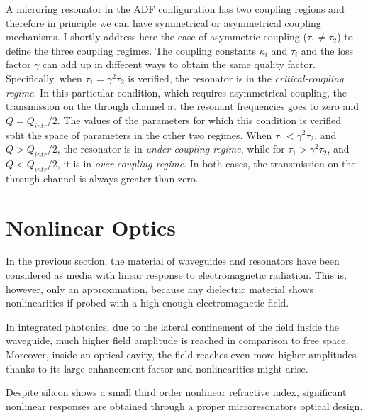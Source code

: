A microring resonator in the ADF configuration has two coupling regions and therefore in principle we can have symmetrical or asymmetrical coupling mechanisms.
I shortly address here the case of asymmetric coupling ($\tau_1 \neq \tau_2$) to define the three coupling regimes.
The coupling constants $\kappa_i$ and $\tau_i$ and the loss factor $\gamma$ can add up in different ways to obtain the same quality factor.
Specifically, when $\tau_1=\gamma^2\tau_2$ is verified, the resonator is in the \textit{critical-coupling regime}.
In this particular condition, which requires asymmetrical coupling, the transmission on the through channel at the resonant frequencies goes to zero and $Q = Q_{intr}/2$.
The values of the parameters for which this condition is verified split the space of parameters in the other two regimes.
When $\tau_1<\gamma^2\tau_2$, and $Q > Q_{intr}/2$, the resonator is in \textit{under-coupling regime}, while for $\tau_1>\gamma^2\tau_2$, and $Q < Q_{intr}/2$, it is in \textit{over-coupling regime}.
In both cases, the transmission on the through channel is always greater than zero.

\clearpage
\section{Nonlinear Optics}
\label{sec:Nonlinear_Optics}
In the previous section, the material of waveguides and resonators have been considered as media with linear response to electromagnetic radiation.
This is, however, only an approximation, because any dielectric material shows nonlinearities if probed with a high enough electromagnetic field.

In integrated photonics, due to the lateral confinement of the field inside the waveguide, much higher field amplitude is reached in comparison to free space.
Moreover, inside an optical cavity, the field reaches even more higher amplitudes thanks to its large enhancement factor and nonlinearities might arise.

Despite silicon shows a small third order nonlinear refractive index, significant nonlinear responses are obtained through a proper microresonators optical design.


